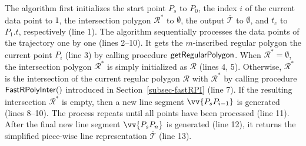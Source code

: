 The algorithm first initializes the start point $P_s$ to $P_0$, the index $i$ of the current data point to $1$, the intersection polygon $\mathcal{R}^*$ to $\emptyset$, the output $\overline{\mathcal{T}}$ to $\emptyset$, and $t_c$ to $P_1.t$, respectively (line 1).
%
The algorithm sequentially processes the data points of the trajectory one by one  (lines 2--10). It gets the $m$-inscribed regular polygon \wrt the current point $P_i$ (line 3) by calling procedure ${\mathsf{getRegularPolygon}}$. When $\mathcal{R}^* = \emptyset$, the intersection polygon $\mathcal{R}^*$ is simply initialized as $\mathcal{R}$ (lines 4, 5). Otherwise,
$\mathcal{R}^*$ is  the intersection of the current regular polygon $\mathcal{R}$ with $\mathcal{R}^*$ by calling procedure ${\mathsf{FastRPolyInter}}()$ introduced in Section~\ref{subsec-fastRPI} (line 7). If the resulting intersection $\mathcal{R}^*$ is empty, then a new line segment $\vv{P_sP_{i-1}}$ is generated (lines 8--10). The process repeats until all points have been processed (line 11).
After the  final new line segment $\vv{P_sP_{n}}$ is generated (line 12), it returns the simplified  piece-wise line representation $\overline{\mathcal{T}}$ (line 13).





